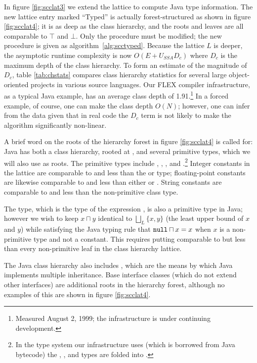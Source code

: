 \documentclass[12pt,titlepage,twoside]{article}
\newcommand{\meet}{\ensuremath{\sqcap}}
\begin{document}
In figure \ref{fig:scclat3} we extend the lattice to compute Java type
information.  The new lattice entry marked ``Typed'' is actually
forest-structured as shown in figure \ref{fig:scclat4}; it is as deep
as the class hierarchy, and the roots and leaves are all comparable to
$\top$ and $\bot$.  Only the  procedure must be modified;
the new procedure is given as algorithm~\ref{alg:scctyped}.
Because the lattice $L$ is
deeper, the asymptotic runtime complexity is now $O(E+U_{SSA}D_c)$
where $D_c$ is the maximum depth of the class hierarchy.  
To form an estimate of the magnitude of $D_c$, table \ref{tab:chstats}
compares class hierarchy statistics for several large
object-oriented projects in various source languages. Our FLEX
compiler infrastructure, as a typical Java example, has an average
class depth of 1.91.\footnote{Measured August 2, 1999; the
infrastructure is under continuing development.}
In a forced example, of course, one can make the class depth $O(N)$;
however, one can infer from the data given that in real code the $D_c$
term is not likely to make the algorithm significantly non-linear.

A brief word on the roots of the hierarchy forest in figure
\ref{fig:scclat4} is called for: Java has both a class hierarchy,
rooted at , and several primitive types, which
we will also use as roots.  The primitive types include
, , , and
.\footnote{In the type system our infrastructure uses
(which is borrowed from Java bytecode) the ,
,  and  types are folded into
.}  Integer constants in the lattice are comparable to and
less than the  or  type; floating-point constants
are likewise comparable to and less than either  or
.  String constants are comparable to and less than the
 non-primitive class type.

The  type, which is the type of the expression ,
is also a primitive type in Java; however we wish to keep $x \meet y$
identical to $\bigsqcup_L\{x, y\}$ (the least upper bound of $x$ and
$y$) while satisfying the Java typing rule that $\code{null} \meet x = x$
when $x$ is a non-primitive type and not a constant.  This requires
putting  comparable to but less than every non-primitive
leaf in the class hierarchy lattice.

The Java class hierarchy also includes , which are
the means by which Java implements multiple inheritance.  Base
interface classes (which do not extend other interfaces) are additional
roots in the hierarchy forest, although no examples of this are shown
in figure \ref{fig:scclat4}.
\end{document}
